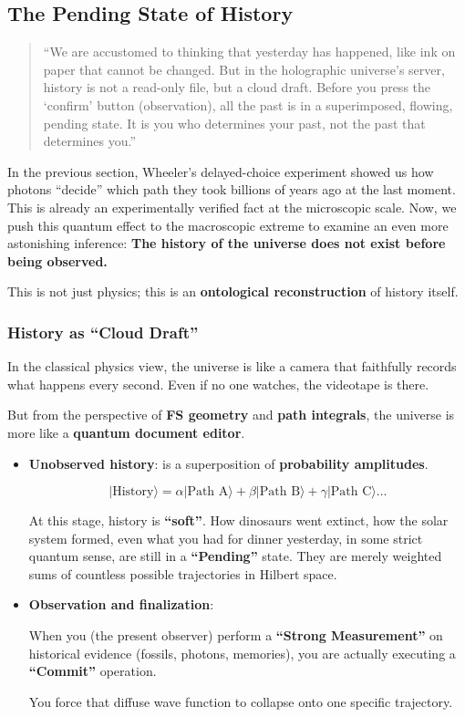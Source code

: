 \subsection{The Pending State of History}

\begin{quote}
``We are accustomed to thinking that yesterday has happened, like ink on paper that cannot be changed. But in the holographic universe's server, history is not a read-only file, but a cloud draft. Before you press the `confirm' button (observation), all the past is in a superimposed, flowing, pending state. It is you who determines your past, not the past that determines you.''
\end{quote}

In the previous section, Wheeler's delayed-choice experiment showed us how photons ``decide'' which path they took billions of years ago at the last moment. This is already an experimentally verified fact at the microscopic scale. Now, we push this quantum effect to the macroscopic extreme to examine an even more astonishing inference: \textbf{The history of the universe does not exist before being observed.}

This is not just physics; this is an \textbf{ontological reconstruction} of history itself.

\subsubsection{History as ``Cloud Draft''}

In the classical physics view, the universe is like a camera that faithfully records what happens every second. Even if no one watches, the videotape is there.

But from the perspective of \textbf{FS geometry} and \textbf{path integrals}, the universe is more like a \textbf{quantum document editor}.

\begin{itemize}
\item \textbf{Unobserved history}: is a superposition of \textbf{probability amplitudes}.

\[|\text{History}\rangle = \alpha |\text{Path A}\rangle + \beta |\text{Path B}\rangle + \gamma |\text{Path C}\rangle \dots\]

At this stage, history is \textbf{``soft''}. How dinosaurs went extinct, how the solar system formed, even what you had for dinner yesterday, in some strict quantum sense, are still in a \textbf{``Pending''} state. They are merely weighted sums of countless possible trajectories in Hilbert space.

\item \textbf{Observation and finalization}:

When you (the present observer) perform a \textbf{``Strong Measurement''} on historical evidence (fossils, photons, memories), you are actually executing a \textbf{``Commit''} operation.

You force that diffuse wave function to collapse onto one specific trajectory.
\end{itemize}

